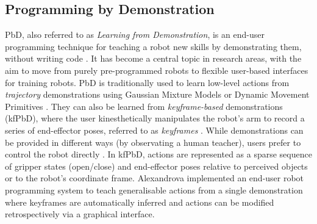 \subsection{Programming by Demonstration}\label{subsec:RPbD}
PbD, also referred to as \textit{Learning from Demonstration}, is an end-user programming technique for teaching a robot new skills by demonstrating them, without writing code \cite{billard2008robot}.
It has become a central topic in research areas, with the aim to move from purely pre-programmed robots to flexible user-based interfaces for training robots.
PbD is traditionally used to learn low-level actions from \textit{trajectory} demonstrations using Gaussian Mixture Models \cite{billard2008robot,calinon2007incremental} or Dynamic Movement Primitives \cite{pastor2009learning}.
They can also be learned from \textit{keyframe-based} demonstrations (kfPbD), where the user kinesthetically manipulates the robot's arm to record a series of end-effector poses, referred to as \textit{keyframes} \cite{akgun2012keyframe}.
While demonstrations can be provided in different ways (\eg by observating a human teacher), users prefer to control the robot directly \cite{suay2012practical}.
In kfPbD, actions are represented as a sparse sequence of gripper states (open/close) and end-effector poses relative to perceived objects or to the robot's coordinate frame.
Alexandrova \etal \cite{alexandrova2014robot} implemented an end-user robot programming system to teach generalisable actions from a single demonstration where keyframes are automatically inferred and actions can be modified retrospectively via a graphical interface.

